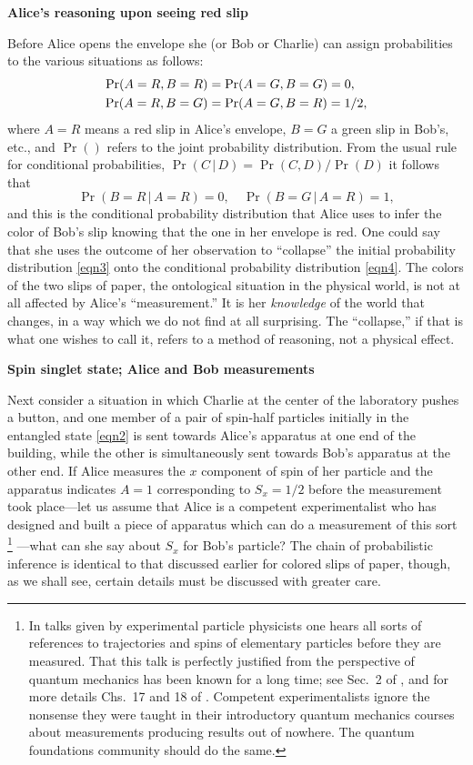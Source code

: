 \documentclass[10pt]{article} %
\def\outl#1{\par{\medskip\noindent\hspace*{.5cm}\bf
      \mathversion{bold}#1\mathversion{normal}\smallskip} }
\def\np{} \def\xa{} \def\xb{} \def\xn{} \def\xp{}
\def\outl#1{} \def\np{} \def\xa{} \def\xb{} \def\xn{} \def\xp{}
\def\outl#1{\par{\medskip\noindent\hspace*{.5cm}\bf
      \mathversion{bold}#1\mathversion{normal}\smallskip} }
\def\np{\newpage }\def\xn{\nopagebreak }\def\xp{\pagebreak }
\newcommand{\vb}{\,|\,}
\begin{document}
\xb
\outl{Alice's reasoning upon seeing red slip}
\xa




Before Alice opens the envelope she (or Bob or Charlie) can assign
probabilities to the various situations as follows:
\begin{align}
  \Pr(A=R,B=R) & = \Pr(A=G,B=G) = 0,
\notag\\ 
 \Pr(A=R,B=G) &= \Pr(A=G,B=R) = 1/2 ,
\label{eqn3}
\end{align}
where $A=R$ means a red slip in Alice's envelope, $B=G$ a green slip in Bob's,
etc., and $\Pr()$ refers to the joint probability distribution. From
the usual rule for conditional probabilities, $\Pr(C\vb D) = \Pr(C,D)/\Pr(D)$ 
it follows that
\begin{equation}
  \Pr(B=R\vb A=R) = 0,\quad \Pr(B=G\vb A=R) = 1,
\label{eqn4}
\end{equation}
and this is the conditional probability distribution that Alice uses to
infer the color of Bob's slip knowing that the one in her envelope is red.
One could say that she uses the outcome of her observation to ``collapse'' the
initial probability distribution \eqref{eqn3} onto the conditional probability
distribution \eqref{eqn4}.  The colors of the two slips of paper, the
ontological situation in the physical world, is not at all affected by Alice's
``measurement.''  It is her \emph{knowledge} of the world that changes, in a
way which we do not find at all surprising.  The ``collapse,'' if that is what
one wishes to call it, refers to a method of reasoning, not a physical effect.

\xb
\outl{Spin singlet state; Alice and Bob measurements}
\xa



Next consider a situation in which Charlie at the center of the laboratory
pushes a button, and one member of a pair of spin-half particles initially in
the entangled state \eqref{eqn2} is sent towards Alice's apparatus at one end
of the building, while the other is simultaneously sent towards Bob's
apparatus at the other end.  If Alice measures the $x$ component of spin of
her particle and the apparatus indicates $A=1$ corresponding to $S_x=1/2$
before the measurement took place---let us assume that Alice is a competent
experimentalist who has designed and built a piece of apparatus which can do a
measurement of this sort%
\footnote{In talks given by experimental particle physicists one hears all
  sorts of references to trajectories and spins of elementary particles before
  they are measured.  That this talk is perfectly justified from the
  perspective of quantum mechanics has been known for a long time; see Sec.~2
  of \cite{Grff84}, and for more details Chs.~17 and 18 of
  \cite{Grff02c}. Competent experimentalists ignore the nonsense they were
  taught in their introductory quantum mechanics courses about measurements
  producing results out of nowhere.  The quantum foundations community should
  do the same.}%
---what can she say about $S_x$ for Bob's
particle?  The chain of probabilistic inference is identical to that discussed
earlier for colored slips of paper, though, as we shall see, certain details
must be discussed with greater care.
\end{document}
